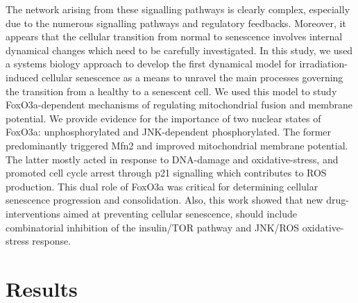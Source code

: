 The network arising from these signalling pathways is clearly complex, especially due to the numerous signalling pathways and regulatory feedbacks. Moreover, it appears that the cellular transition from normal to senescence involves internal dynamical changes which need to be carefully investigated. In this study, we used a systems biology approach to develop the first dynamical model for irradiation-induced cellular senescence as a means to unravel the main processes governing the transition from a healthy to a senescent cell. We used this model to study FoxO3a-dependent mechanisms of regulating mitochondrial fusion and membrane potential. We provide evidence for the importance of two nuclear states of FoxO3a: unphosphorylated and JNK-dependent phosphorylated. The former predominantly triggered Mfn2 and improved mitochondrial membrane potential. The latter mostly acted in response to DNA-damage and oxidative-stress, and promoted cell cycle arrest through p21 signalling which contributes to ROS production. 
This dual role of FoxO3a was critical for determining cellular senescence progression and consolidation. Also, this work showed that new drug-interventions aimed at preventing cellular senescence, should include combinatorial inhibition of the insulin/TOR pathway and JNK/ROS oxidative-stress response.


\section{Results}
\label{project3-sec:Results}

